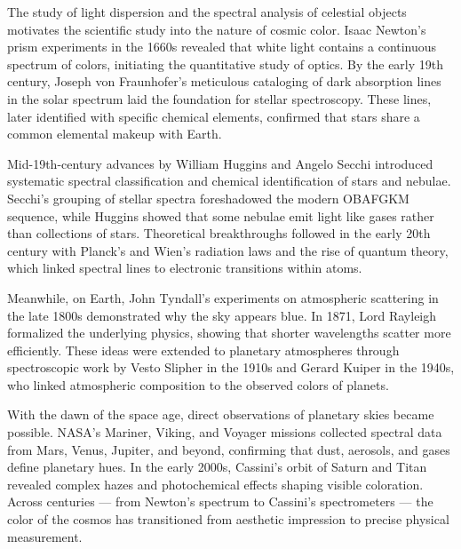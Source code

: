 \begin{historical}
The study of light dispersion and the spectral analysis of celestial objects motivates the scientific study into the nature of cosmic color. Isaac Newton's prism experiments in the 1660s revealed that white light contains a continuous spectrum of colors, initiating the quantitative study of optics. By the early 19th century, Joseph von Fraunhofer's meticulous cataloging of dark absorption lines in the solar spectrum laid the foundation for stellar spectroscopy. These lines, later identified with specific chemical elements, confirmed that stars share a common elemental makeup with Earth.

Mid-19th-century advances by William Huggins and Angelo Secchi introduced systematic spectral classification and chemical identification of stars and nebulae. Secchi's grouping of stellar spectra foreshadowed the modern OBAFGKM sequence, while Huggins showed that some nebulae emit light like gases rather than collections of stars. Theoretical breakthroughs followed in the early 20th century with Planck's and Wien's radiation laws and the rise of quantum theory, which linked spectral lines to electronic transitions within atoms.

Meanwhile, on Earth, John Tyndall's experiments on atmospheric scattering in the late 1800s demonstrated why the sky appears blue. In 1871, Lord Rayleigh formalized the underlying physics, showing that shorter wavelengths scatter more efficiently. These ideas were extended to planetary atmospheres through spectroscopic work by Vesto Slipher in the 1910s and Gerard Kuiper in the 1940s, who linked atmospheric composition to the observed colors of planets.

With the dawn of the space age, direct observations of planetary skies became possible. NASA's Mariner, Viking, and Voyager missions collected spectral data from Mars, Venus, Jupiter, and beyond, confirming that dust, aerosols, and gases define planetary hues. In the early 2000s, Cassini's orbit of Saturn and Titan revealed complex hazes and photochemical effects shaping visible coloration. Across centuries --- from Newton's spectrum to Cassini's spectrometers --- the color of the cosmos has transitioned from aesthetic impression to precise physical measurement.
\end{historical}
